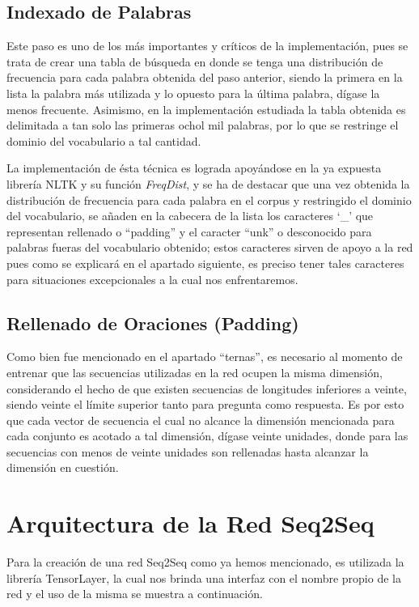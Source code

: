 \documentclass[12pt, letterpaper]{article}
\begin{document}
        \subsection{Indexado de Palabras}
        Este paso es uno de los más importantes y críticos de la implementación, pues se trata de crear una tabla de búsqueda en donde se tenga una distribución de frecuencia para cada palabra obtenida del paso anterior, siendo la primera en la lista la  palabra más utilizada y lo opuesto para la última palabra, dígase la menos frecuente. Asimismo, en la implementación estudiada la tabla obtenida es delimitada a tan solo las primeras ochol mil palabras, por lo que se restringe el dominio del vocabulario a tal cantidad.
        
        La implementación de ésta técnica es lograda apoyándose en la ya expuesta librería NLTK y su función \emph{FreqDist}, y se ha de destacar que una vez obtenida la distribución de frecuencia para cada palabra en el corpus y restringido el dominio del vocabulario, se añaden en la cabecera de la lista los caracteres ‘\_’ que representan rellenado o “padding” y el caracter “unk” o desconocido para palabras fueras del vocabulario obtenido; estos caracteres sirven de apoyo a la red pues como se explicará en el apartado siguiente, es preciso tener tales caracteres para situaciones excepcionales a la cual nos enfrentaremos.
        
        \subsection{Rellenado de Oraciones (Padding)}
        Como bien fue mencionado en el apartado “ternas”, es necesario al momento de entrenar que las secuencias utilizadas en la red  ocupen la misma dimensión, considerando el hecho de que existen secuencias de longitudes inferiores a veinte, siendo veinte el límite superior tanto para pregunta como respuesta. Es por esto que cada vector de secuencia el cual no alcance la dimensión mencionada para cada conjunto es acotado a tal dimensión, dígase veinte unidades, donde para las secuencias con menos de veinte unidades son rellenadas hasta alcanzar la dimensión en cuestión.


    \section{Arquitectura de la Red Seq2Seq}
        Para la creación de una red Seq2Seq como ya hemos mencionado, es utilizada la librería TensorLayer, la cual nos brinda una interfaz con el nombre propio de la red y el uso de la misma se muestra a continuación.
        
\end{document}

